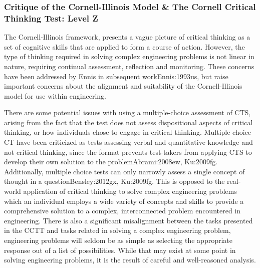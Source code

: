 \subsubsection{Critique of the Cornell-Illinois Model & The Cornell Critical Thinking Test: Level Z}

The Cornell-Illinois framework, presents a vague picture of critical thinking as a set of cognitive skills that are applied to form a course of action.  However, the type of thinking required in solving complex engineering problems is not linear in nature, requiring continual assessment, reflection and monitoring.  These concerns have been addressed by Ennis in subsequent work{Ennis:1993us}, but raise important concerns about the alignment and suitability of the Cornell-Illinois model for use within engineering.  

There are some potential issues with using a multiple-choice assessment of CTS, arising from the fact that the test does not assess dispositional aspects of critical thinking, or how individuals chose to engage in critical thinking.  Multiple choice CT have been criticized as tests assessing verbal and quantitative knowledge and not critical thinking, since the format prevents test-takers from applying CTS to develop their own solution to the problem{Abrami:2008ew, Ku:2009fg}. Additionally, multiple choice tests can only narrowly assess a single concept of thought in a question{Bensley:2012gx, Ku:2009fg}.  This is opposed to the real-world application of critical thinking to solve complex engineering problems which an individual employs a wide variety of concepts and skills to provide a comprehensive solution to a complex, interconnected problem encountered in engineering.  There is also a significant misalignment between the tasks presented in the CCTT and tasks related in solving a complex engineering problem, engineering problems will seldom be as simple as selecting the appropriate response out of a list of possibilities.  While that may exist at some point in solving engineering problems, it is the result of careful and well-reasoned analysis.